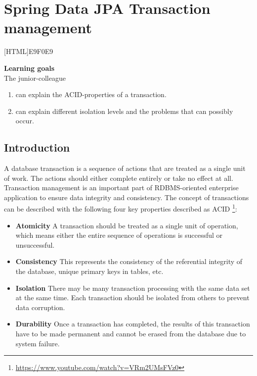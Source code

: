 \chapter{Spring Data JPA Transaction management}

[HTML]{E9F0E9}{\parbox{\textwidth}{%
\noindent \textbf{Learning goals}\\
The junior-colleague
\begin{enumerate}[nolistsep]
\item can explain the ACID-properties of a transaction.
\item can explain different isolation levels and the problems that can possibly occur.
\end{enumerate}}}

\section{Introduction}

A database transaction is a sequence of actions that are treated as a single unit of work. The actions should either complete entirely or take no effect at all. Transaction management is an important part of RDBMS-oriented enterprise application to ensure data integrity and consistency. The concept of transactions can be described with the following four key properties described as ACID \footnote{\url{https://www.youtube.com/watch?v=VRm2UMsFVz0}}:

\begin{itemize}
\item \textbf{Atomicity} A transaction should be treated as a single unit of operation, which means either the entire sequence of operations is successful or unsuccessful.

\item \textbf{Consistency} This represents the consistency of the referential integrity of the database, unique primary keys in tables, etc.

\item \textbf{Isolation} There may be many transaction processing with the same data set at the same time. Each transaction should be isolated from others to prevent data corruption.

\item \textbf{Durability} Once a transaction has completed, the results of this transaction have to be made permanent and cannot be erased from the database due to system failure.
\end{itemize}

